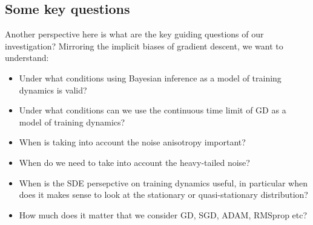 \documentclass[11pt]{article}
\begin{document}
\subsection*{Some key questions}
Another perspective here is what are the key guiding questions of our investigation? Mirroring the implicit biases of gradient descent, we want to understand:
\begin{itemize}
\item Under what conditions using Bayesian inference as a model of training dynamics is valid?
\item Under what conditions can we use the continuous time limit of GD as a model of training dynamics?
\item When is taking into account the noise anisotropy important?
\item When do we need to take into account the heavy-tailed noise?
\item When is the SDE persepctive on training dynamics useful, in particular when does it makes sense to look at the stationary or quasi-stationary distribution?
\item How much does it matter that we consider GD, SGD, ADAM, RMSprop etc?
\end{itemize}
\end{document}
